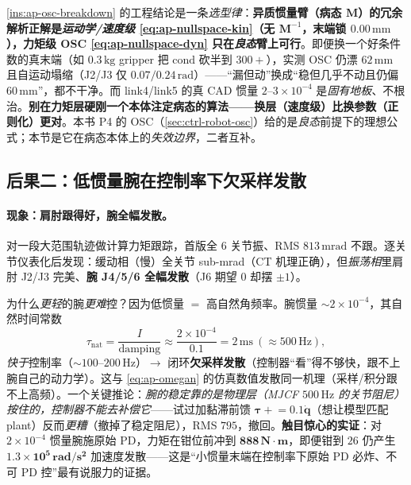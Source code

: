 \begin{insight}\label{ins:ap-redundancy-level}
\cref{ins:ap-osc-breakdown} 的工程结论是一条\emph{选型律}：\textbf{异质惯量臂（病态 $\mathbf{M}$）的冗余解析正解是\emph{运动学/速度级} \cref{eq:ap-nullspace-kin}（无 $\mathbf{M}^{-1}$，末端锁 $0.00\,\mathrm{mm}$），力矩级 OSC \cref{eq:ap-nullspace-dyn} 只在\emph{良态}臂上可行}。即便换一个好条件数的真末端（如 $0.3\,\mathrm{kg}$ gripper 把 $\mathrm{cond}$ 砍半到 $300+$），实测 OSC 仍漂 $62\,\mathrm{mm}$ 且自运动塌缩（J2/J3 仅 $0.07/0.24\,\mathrm{rad}$）——“漏但动”换成“稳但几乎不动且仍偏 $60\,\mathrm{mm}$”，都不干净。而 link4/link5 的真 CAD 惯量 $2$--$3\times10^{-4}$ 是\emph{固有地板}、不根治。\textbf{别在力矩层硬刚一个本体注定病态的算法——换层（速度级）比换参数（正则化）更对}。本书 P4 的 OSC（\cref{sec:ctrl-robot-osc}）给的是\emph{良态}前提下的理想公式；本节是它在病态本体上的\emph{失效边界}，二者互补。
\end{insight}

\subsection{后果二：低惯量腕在控制率下欠采样发散}
\label{sec:ap-lowinertia}

\paragraph{现象：肩肘跟得好，腕全幅发散。}
对一段大范围轨迹做计算力矩跟踪，首版全 $6$ 关节振、RMS $813\,\mathrm{mrad}$ 不跟。逐关节仪表化后发现：缓动相（慢）全关节 sub-mrad（CT 机理正确），但\emph{振荡相}里肩肘 J2/J3 完美、\textbf{腕 J4/5/6 全幅发散}（J6 期望 $0$ 却摆 $\pm1$）。

\begin{insight}[低惯量 $=$ 高自然频率 $=$ 控制率欠采样发散]\label{ins:ap-lowinertia}
为什么\emph{更轻}的腕\emph{更难}控？因为低惯量 $=$ 高自然角频率。腕惯量 $\sim2\times10^{-4}$，其自然时间常数
\begin{equation}
  \tau_{\mathrm{nat}}=\frac{I}{\text{damping}}\approx\frac{2\times10^{-4}}{0.1}=2\,\mathrm{ms}\ (\approx 500\,\mathrm{Hz}),
  \label{eq:ap-taunat}
\end{equation}
\emph{快于}控制率（$\sim100$--$200\,\mathrm{Hz}$）$\to$ 闭环\textbf{欠采样发散}（控制器“看”得不够快，跟不上腕自己的动力学）。这与 \cref{eq:ap-omegan} 的仿真数值发散同一机理（采样/积分跟不上高频）。一个关键推论：\emph{腕的稳定靠的是物理层（MJCF $500\,\mathrm{Hz}$ 的关节阻尼）按住的，控制器\emph{不能}去补偿它}——试过加黏滞前馈 $\boldsymbol{\tau}\mathrel{+}=0.1\dot{\mathbf{q}}$（想让模型匹配 plant）反而\emph{更糟}（撤掉了稳定阻尼），RMS $795$，撤回。\textbf{触目惊心的实证}：对 $2\times10^{-4}$ 惯量腕施原始 PD，力矩在钳位前冲到 $\mathbf{888\,N\!\cdot\! m}$，即便钳到 $26$ 仍产生 $\mathbf{1.3\times10^{5}\,rad/s^2}$ 加速度发散——这是“小惯量末端在控制率下原始 PD 必炸、不可 PD 控”最有说服力的证据。
\end{insight}

